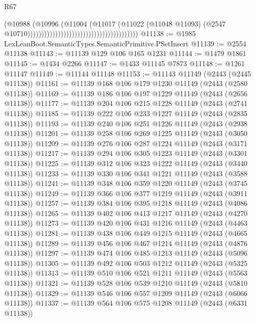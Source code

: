 \begin{lexlean}{R67}
\begin{coremodule}
                                                                        (@10988
                                                                          (@10996
                                                                            (@11004
                                                                              (@11017
                                                                                (@11022
                                                                                  (@11048 @11093)
                                                                                  (@2547
                                                                                    @10710))))))))))))))))))))))))))))))))))))))))
@11138 := @1985 LexLeanBoot.SemanticTypes.SemanticPrimitive.PSetInsert
@11139 := @2554 @11138
@11143 := @11139 @129 @106 @165 @1231
@11144 := @1479 @1861
@11145 := @1434 @2266
@11147 := @1433 @11145 @7873
@11148 := @1261 @11147
@11149 := @11144 @11148
@11153 := @11143 @11149 (@2443 (@2445 @11138))
@11161 := @11139 @168 @106 @179 @1230 @11149 (@2443 (@2580 @11138))
@11169 := @11139 @186 @106 @197 @1229 @11149 (@2443 (@2656 @11138))
@11177 := @11139 @204 @106 @215 @1228 @11149 (@2443 (@2741 @11138))
@11185 := @11139 @222 @106 @233 @1227 @11149 (@2443 (@2835 @11138))
@11193 := @11139 @240 @106 @251 @1226 @11149 (@2443 (@2938 @11138))
@11201 := @11139 @258 @106 @269 @1225 @11149 (@2443 (@3050 @11138))
@11209 := @11139 @276 @106 @287 @1224 @11149 (@2443 (@3171 @11138))
@11217 := @11139 @294 @106 @305 @1223 @11149 (@2443 (@3301 @11138))
@11225 := @11139 @312 @106 @323 @1222 @11149 (@2443 (@3440 @11138))
@11233 := @11139 @330 @106 @341 @1221 @11149 (@2443 (@3588 @11138))
@11241 := @11139 @348 @106 @359 @1220 @11149 (@2443 (@3745 @11138))
@11249 := @11139 @366 @106 @377 @1219 @11149 (@2443 (@3911 @11138))
@11257 := @11139 @384 @106 @395 @1218 @11149 (@2443 (@4086 @11138))
@11265 := @11139 @402 @106 @413 @1217 @11149 (@2443 (@4270 @11138))
@11273 := @11139 @420 @106 @431 @1216 @11149 (@2443 (@4463 @11138))
@11281 := @11139 @438 @106 @449 @1215 @11149 (@2443 (@4665 @11138))
@11289 := @11139 @456 @106 @467 @1214 @11149 (@2443 (@4876 @11138))
@11297 := @11139 @474 @106 @485 @1213 @11149 (@2443 (@5096 @11138))
@11305 := @11139 @492 @106 @503 @1212 @11149 (@2443 (@5325 @11138))
@11313 := @11139 @510 @106 @521 @1211 @11149 (@2443 (@5563 @11138))
@11321 := @11139 @528 @106 @539 @1210 @11149 (@2443 (@5810 @11138))
@11329 := @11139 @546 @106 @557 @1209 @11149 (@2443 (@6066 @11138))
@11337 := @11139 @564 @106 @575 @1208 @11149 (@2443 (@6331 @11138))

\end{coremodule}
\end{lexlean}
